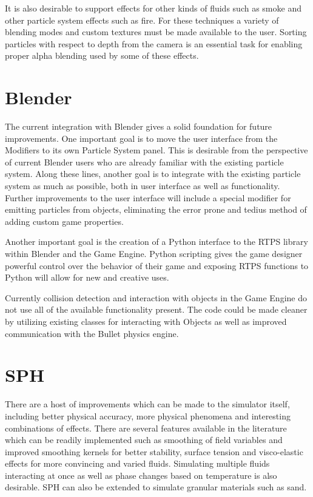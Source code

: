 It is also desirable to support effects for other kinds of fluids such as smoke
and other particle system effects such as fire. For these techniques a variety
of blending modes and custom textures must be made available to the user.
Sorting particles with respect to depth from the camera is an essential task
for enabling proper alpha blending used by some of these effects.

\section{Blender}

The current integration with Blender gives a solid foundation for future
improvements. One important goal is to move the user interface from the
Modifiers to its own Particle System panel. This is desirable from the
perspective of current Blender users who are already familiar with the existing
particle system. Along these lines, another goal is to integrate with the
existing particle system as much as possible, both in user interface as well as
functionality.
Further improvements to the user interface will include a special modifier for
emitting particles from objects, eliminating the error prone and tedius method
of adding custom game properties. 


Another important goal is the creation of a Python interface to the RTPS
library within Blender and the Game Engine. Python scripting gives the game
designer powerful control over the behavior of their game and exposing RTPS
functions to Python will allow for new and creative uses. 


Currently collision detection and interaction with objects in the Game Engine
do not use all of the available functionality present. The code could be made
cleaner by utilizing existing classes for interacting with Objects as well as
improved communication with the Bullet physics engine.  

\section{SPH}

There are a host of improvements which can be made to the simulator itself,
including better physical accuracy, more physical phenomena and interesting
combinations of effects.
There are several features available in the literature which can be readily
implemented such as smoothing of field variables and improved smoothing kernels for better
stability\cite{Liu2010}, surface tension and visco-elastic
effects for more convincing and varied fluids\cite{Clavet2005}. Simulating
multiple fluids interacting at once as well as phase changes based on
temperature is also desirable.\cite{Muller2005} SPH can also be extended to
simulate granular materials such as sand.\cite{Bell2005}


